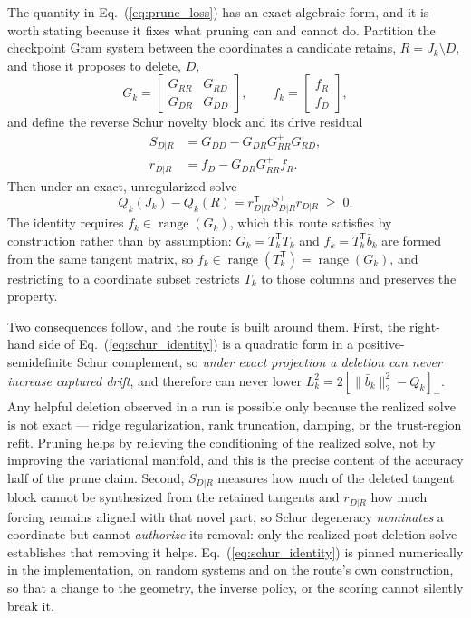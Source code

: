 \documentclass[
  reprint,
  amsmath,
  amssymb,
  aps,
  pra,
  nofootinbib,
  superscriptaddress,
  floatfix
]{revtex4-2}
\begin{document}
The quantity in Eq.~(\ref{eq:prune_loss}) has an exact algebraic form, and it is worth stating because it fixes what pruning can and cannot do.  Partition the checkpoint Gram system between the coordinates a candidate retains, \(R=J_k\setminus D\), and those it proposes to delete, \(D\),
\begin{equation}
G_k=
\begin{bmatrix} G_{RR} & G_{RD}\\ G_{DR} & G_{DD}\end{bmatrix},
\qquad
f_k=\begin{bmatrix} f_R\\ f_D\end{bmatrix},
\end{equation}
and define the reverse Schur novelty block and its drive residual
\begin{equation}
\begin{aligned}
S_{D|R}&=G_{DD}-G_{DR}G_{RR}^{+}G_{RD},\\
r_{D|R}&=f_D-G_{DR}G_{RR}^{+}f_R .
\end{aligned}
\label{eq:schur_novelty}
\end{equation}
Then under an exact, unregularized solve
\begin{equation}
Q_k(J_k)-Q_k(R)=r_{D|R}^{\mathsf T}S_{D|R}^{+}r_{D|R}\;\ge\;0 .
\label{eq:schur_identity}
\end{equation}
The identity requires \(f_k\in\operatorname{range}(G_k)\), which this route satisfies by construction rather than by assumption: \(G_k=T_k^{\mathsf T}T_k\) and \(f_k=T_k^{\mathsf T}\bar b_k\) are formed from the same tangent matrix, so \(f_k\in\operatorname{range}(T_k^{\mathsf T})=\operatorname{range}(G_k)\), and restricting to a coordinate subset restricts \(T_k\) to those columns and preserves the property.

Two consequences follow, and the route is built around them.  First, the right-hand side of Eq.~(\ref{eq:schur_identity}) is a quadratic form in a positive-semidefinite Schur complement, so \emph{under exact projection a deletion can never increase captured drift}, and therefore can never lower \(L_k^2=2[\|\bar b_k\|_2^2-Q_k]_+\).  Any helpful deletion observed in a run is possible only because the realized solve is not exact --- ridge regularization, rank truncation, damping, or the trust-region refit.  Pruning helps by relieving the conditioning of the realized solve, not by improving the variational manifold, and this is the precise content of the accuracy half of the prune claim.  Second, \(S_{D|R}\) measures how much of the deleted tangent block cannot be synthesized from the retained tangents and \(r_{D|R}\) how much forcing remains aligned with that novel part, so Schur degeneracy \emph{nominates} a coordinate but cannot \emph{authorize} its removal: only the realized post-deletion solve establishes that removing it helps.  Eq.~(\ref{eq:schur_identity}) is pinned numerically in the implementation, on random systems and on the route's own construction, so that a change to the geometry, the inverse policy, or the scoring cannot silently break it.
\end{document}
